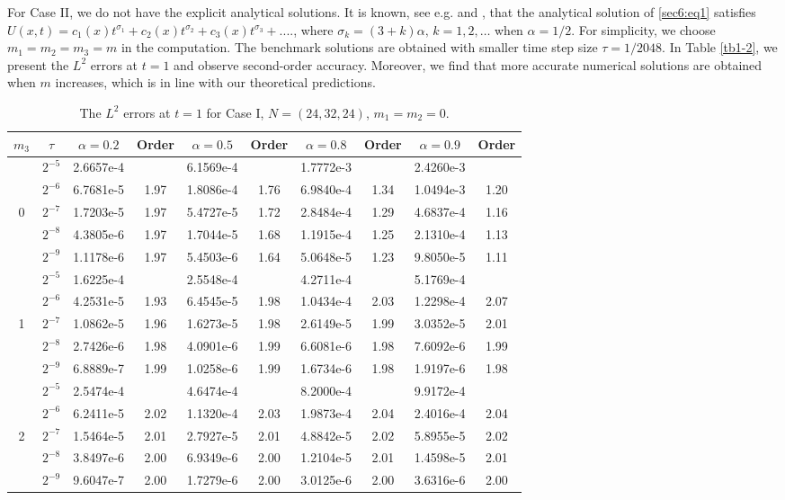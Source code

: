 \documentclass[10pt]{siamltex}
\begin{document}
For Case II,
we do not have the explicit analytical solutions.
It is known, see e.g.   \cite[p. 183]{Diethelm-B10} and
\cite{JiangLiu-etal12b,JiangLiu-etal12,Luchko11},
that the analytical solution of \eqref{sec6:eq1} satisfies $U(x,t)=c_1(x)t^{\sigma_1}+c_2(x)t^{\sigma_2}+c_3(x)t^{\sigma_3}+....$,
where $\sigma_k=(3+k)\alpha,\,k=1,2,\ldots$ when $\alpha=1/2$.
For simplicity, we choose $m_1=m_2=m_3=m$ in the computation.
The benchmark solutions are obtained with smaller time step size $\tau=1/2048$.
In Table \ref{tb1-2}, we present the   $L^2$ errors at $t=1$ and observe second-order accuracy. Moreover,
we find that  more accurate numerical solutions are obtained when $m$ increases, which is in line with our theoretical predictions.

\begin{table}[!h]
\caption{{The   $L^{2}$ errors at $t=1$ for Case I, $N=(24,32,24)$, $m_1=m_2=0$.}}\label{tb1-1}
\centering\footnotesize
\begin{tabular}{|c|c|c|c|c|c|c|c|c|c|}
\hline
$m_3$& $\tau$ & $\alpha=0.2$ & Order& $\alpha=0.5$ & Order& $\alpha=0.8$ & Order & $\alpha=0.9$ & Order\\
 \hline
 &$2^{-5}$&2.6657e-4&    &6.1569e-4&    &1.7772e-3&    &2.4260e-3&    \\
 &$2^{-6}$&6.7681e-5&1.97&1.8086e-4&1.76&6.9840e-4&1.34&1.0494e-3&1.20\\
0&$2^{-7}$&1.7203e-5&1.97&5.4727e-5&1.72&2.8484e-4&1.29&4.6837e-4&1.16\\
 &$2^{-8}$&4.3805e-6&1.97&1.7044e-5&1.68&1.1915e-4&1.25&2.1310e-4&1.13\\
 &$2^{-9}$&1.1178e-6&1.97&5.4503e-6&1.64&5.0648e-5&1.23&9.8050e-5&1.11\\
 \hline
 &$2^{-5}$&1.6225e-4&    &2.5548e-4&    &4.2711e-4&    &5.1769e-4&    \\
 &$2^{-6}$&4.2531e-5&1.93&6.4545e-5&1.98&1.0434e-4&2.03&1.2298e-4&2.07\\
1&$2^{-7}$&1.0862e-5&1.96&1.6273e-5&1.98&2.6149e-5&1.99&3.0352e-5&2.01\\
 &$2^{-8}$&2.7426e-6&1.98&4.0901e-6&1.99&6.6081e-6&1.98&7.6092e-6&1.99\\
 &$2^{-9}$&6.8889e-7&1.99&1.0258e-6&1.99&1.6734e-6&1.98&1.9197e-6&1.98\\
 \hline
 &$2^{-5}$&2.5474e-4&    &4.6474e-4&    &8.2000e-4&    &9.9172e-4&    \\
 &$2^{-6}$&6.2411e-5&2.02&1.1320e-4&2.03&1.9873e-4&2.04&2.4016e-4&2.04\\
2&$2^{-7}$&1.5464e-5&2.01&2.7927e-5&2.01&4.8842e-5&2.02&5.8955e-5&2.02\\
 &$2^{-8}$&3.8497e-6&2.00&6.9349e-6&2.00&1.2104e-5&2.01&1.4598e-5&2.01\\
 &$2^{-9}$&9.6047e-7&2.00&1.7279e-6&2.00&3.0125e-6&2.00&3.6316e-6&2.00\\
\hline
\end{tabular}
\end{table}
%
\end{document}
